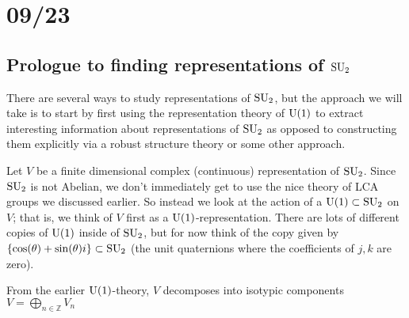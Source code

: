\documentclass[../../rtnotes.tex]{subfiles}
\begin{document}
\section{09/23}
\subsection{Prologue to finding representations of $\operatorname{SU}_2$}
There are several ways to study representations of $\operatorname{SU}_2$, but the approach we will take is to start by first using the representation theory of $\operatorname{U}(1)$ to extract interesting information about representations of $\operatorname{SU}_2$ as opposed to constructing them explicitly via a robust structure theory or some other approach.

Let $V$ be a finite dimensional complex (continuous) representation of $\operatorname{SU}_2$. Since $\operatorname{SU}_2$ is not Abelian, we don't immediately get to use the nice theory of LCA groups we discussed earlier. So instead we look at the action of a $\operatorname{U}(1)\subset \operatorname{SU}_2$ on $V$; that is, we think of $V$ first as a $\operatorname{U}(1)$-representation. There are lots of different copies of $\operatorname{U}(1)$ inside of $\operatorname{SU}_2$, but for now think of the copy given by $\{\cos(\theta) + \sin(\theta)i\}\subset \operatorname{SU}_2$ (the unit quaternions where the coefficients of $j,k$ are zero).

From the earlier $\operatorname{U}(1)$-theory, $V$ decomposes into isotypic components $V = \bigoplus_{n\in\mathbb Z}V_n$
\end{document}
